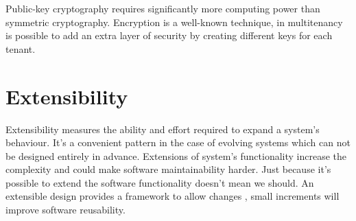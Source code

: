 \documentclass[11pt,english]{article} %
\begin{document}
Public‐key cryptography requires significantly more computing power than symmetric cryptography.
Encryption is a well-known technique, in multitenancy is possible to add an extra layer of security by creating different keys for each tenant.



\section{Extensibility}
Extensibility measures the ability and effort required to expand a system's behaviour.
It's a convenient pattern in the case of evolving systems which can not be designed entirely in advance.
Extensions of system's functionality increase the complexity and could make software maintainability harder. %
Just because it's possible to extend the software functionality doesn't mean we should.
An extensible design provides a framework to allow changes \cite{philosophy-extensible-software}, small increments will improve software reusability.

\
\end{document}
